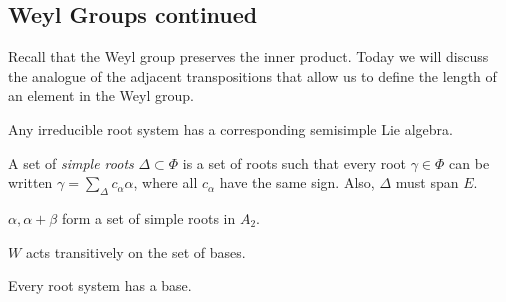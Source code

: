 \documentclass[twoside, 10pt]{article}
\begin{document}
    \subsection{Weyl Groups continued}%
    \label{sub:weyl_groups_continued}
    
    Recall that the Weyl group preserves the inner product. Today we will discuss the analogue of the adjacent transpositions that allow us to define the length of an element in the Weyl group. 

    \begin{rmk}
        Any irreducible root system has a corresponding semisimple Lie algebra.
    \end{rmk}

    \begin{defn}
        A set of \textit{simple roots} $\Delta \subset \Phi$ is a set of roots such that every root $\gamma \in \Phi$ can be written $\gamma = \sum_{\Delta} c_{\alpha}\alpha$, where all $c_{\alpha}$ have the same sign. Also, $\Delta$ must span $E$.
    \end{defn}

    \begin{exm}
        $\alpha,\alpha + \beta$ form a set of simple roots in $A_2$.
    \end{exm}

    \begin{prop}
        $W$ acts transitively on the set of bases.
    \end{prop}

    \begin{prop}
        Every root system has a base.
    \end{prop}
\end{document}
